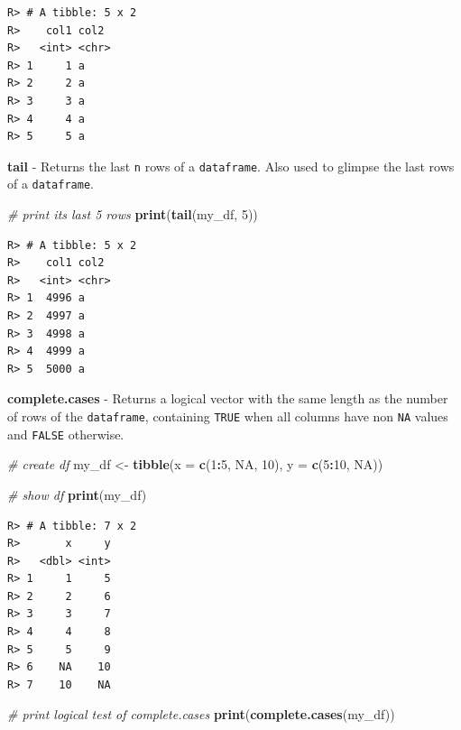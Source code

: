 \documentclass[
  12pt,
]{book}
\newenvironment{Shaded}{\begin{snugshade}}{\end{snugshade}}
\newcommand{\CommentTok}[1]{\textcolor[rgb]{0.37,0.37,0.37}{\textit{#1}}}
\newcommand{\DataTypeTok}[1]{\textcolor[rgb]{0.27,0.27,0.27}{#1}}
\newcommand{\DecValTok}[1]{\textcolor[rgb]{0.06,0.06,0.06}{#1}}
\newcommand{\KeywordTok}[1]{\textcolor[rgb]{0.27,0.27,0.27}{\textbf{#1}}}
\newcommand{\NormalTok}[1]{#1}
\newcommand{\OperatorTok}[1]{\textcolor[rgb]{0.43,0.43,0.43}{\textbf{#1}}}
\newcommand{\OtherTok}[1]{\textcolor[rgb]{0.37,0.37,0.37}{#1}}
\newcommand{\StringTok}[1]{\textcolor[rgb]{0.5,0.5,0.5}{#1}}
\begin{document}
\begin{verbatim}
R> # A tibble: 5 x 2
R>    col1 col2 
R>   <int> <chr>
R> 1     1 a    
R> 2     2 a    
R> 3     3 a    
R> 4     4 a    
R> 5     5 a
\end{verbatim}

\textbf{tail} - Returns the last \texttt{n} rows of a \texttt{dataframe}. Also used to glimpse the last rows of a \texttt{dataframe}. 

\begin{Shaded}
\begin{Highlighting}[]
\CommentTok{# print its last 5 rows}
\KeywordTok{print}\NormalTok{(}\KeywordTok{tail}\NormalTok{(my_df, }\DecValTok{5}\NormalTok{))}
\end{Highlighting}
\end{Shaded}

\begin{verbatim}
R> # A tibble: 5 x 2
R>    col1 col2 
R>   <int> <chr>
R> 1  4996 a    
R> 2  4997 a    
R> 3  4998 a    
R> 4  4999 a    
R> 5  5000 a
\end{verbatim}

\textbf{complete.cases} - Returns a logical vector with the same length as the number of rows of the \texttt{dataframe}, containing \texttt{TRUE} when all columns have non \texttt{NA} values and \texttt{FALSE} otherwise. 

\begin{Shaded}
\begin{Highlighting}[]
\CommentTok{# create df}
\NormalTok{my_df <-}\StringTok{ }\KeywordTok{tibble}\NormalTok{(}\DataTypeTok{x =} \KeywordTok{c}\NormalTok{(}\DecValTok{1}\OperatorTok{:}\DecValTok{5}\NormalTok{, }\OtherTok{NA}\NormalTok{, }\DecValTok{10}\NormalTok{),}
                \DataTypeTok{y =} \KeywordTok{c}\NormalTok{(}\DecValTok{5}\OperatorTok{:}\DecValTok{10}\NormalTok{, }\OtherTok{NA}\NormalTok{))}

\CommentTok{# show df}
\KeywordTok{print}\NormalTok{(my_df)}
\end{Highlighting}
\end{Shaded}

\begin{verbatim}
R> # A tibble: 7 x 2
R>       x     y
R>   <dbl> <int>
R> 1     1     5
R> 2     2     6
R> 3     3     7
R> 4     4     8
R> 5     5     9
R> 6    NA    10
R> 7    10    NA
\end{verbatim}

\begin{Shaded}
\begin{Highlighting}[]
\CommentTok{# print logical test of complete.cases}
\KeywordTok{print}\NormalTok{(}\KeywordTok{complete.cases}\NormalTok{(my_df))}
\end{Highlighting}
\end{Shaded}
\end{document}
